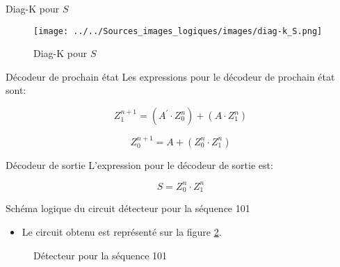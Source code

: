 \documentclass[presentation]{beamer}
\begin{document}
\begin{frame}[label={sec:org231a93c}]{Diag-K pour \(S\)}
\begin{figure}[htbp]
\centering
\texttt{[image: ../../Sources\_images\_logiques/images/diag-k\_S.png]}
\caption{\label{fig:org050a4e1}Diag-K pour \(S\)}
\end{figure}
\end{frame}

\begin{frame}[label={sec:orgffc109d}]{Décodeur de prochain état}
Les expressions pour le décodeur de prochain état sont:

$$ Z_1^{n+1} = (A^\prime \cdot Z_0^{n}) + (A \cdot  Z_1^{n}) $$

$$ Z_0^{n+1} = A + (Z_0^{n} \cdot Z_1^{n}) $$
\end{frame}

\begin{frame}[label={sec:orged20ebf}]{Décodeur de sortie}
L'expression pour le décodeur de sortie est:

$$ S = Z_0^{n} \cdot Z_1^{n} $$
\end{frame}

\begin{frame}[label={sec:orgbb8f431}]{Schéma logique du circuit détecteur pour la séquence 101}
\begin{itemize}
\item Le circuit obtenu est représenté sur la figure \ref{fig:org000214c}.
\end{itemize}

\begin{figure}[htbp]
\centering

\caption{\label{fig:org000214c}Détecteur pour la séquence 101}
\end{figure}
\end{frame}
\end{document}
